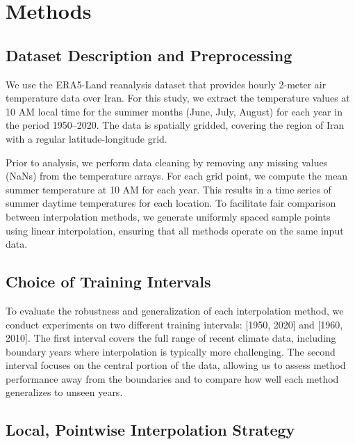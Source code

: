 \section{Methods}

\subsection{Dataset Description and Preprocessing}

We use the ERA5-Land reanalysis dataset \cite{ERA5} that provides hourly 2-meter air temperature data over Iran. For this study, we extract the temperature values at 10 AM local time for the summer months (June, July, August) for each year in the period 1950--2020. The data is spatially gridded, covering the region of Iran with a regular latitude-longitude grid.

Prior to analysis, we perform data cleaning by removing any missing values (NaNs) from the temperature arrays. For each grid point, we compute the mean summer temperature at 10 AM for each year. This results in a time series of summer daytime temperatures for each location. To facilitate fair comparison between interpolation methods, we generate uniformly spaced sample points using linear interpolation, ensuring that all methods operate on the same input data.

\subsection{Choice of Training Intervals}

To evaluate the robustness and generalization of each interpolation method, we conduct experiments on two different training intervals: [1950, 2020] and [1960, 2010]. The first interval covers the full range of recent climate data, including boundary years where interpolation is typically more challenging. The second interval focuses on the central portion of the data, allowing us to assess method performance away from the boundaries and to compare how well each method generalizes to unseen years.

\subsection{Local, Pointwise Interpolation Strategy}

